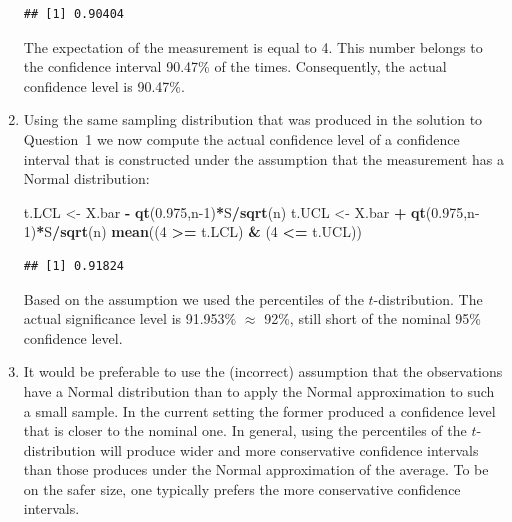 \documentclass[]{krantz}
\makeatletter
\newenvironment{Shaded}{\begin{snugshade}}{\end{snugshade}}
\newcommand{\DecValTok}[1]{\textcolor[rgb]{0.00,0.00,0.81}{#1}}
\newcommand{\FloatTok}[1]{\textcolor[rgb]{0.00,0.00,0.81}{#1}}
\newcommand{\KeywordTok}[1]{\textcolor[rgb]{0.13,0.29,0.53}{\textbf{#1}}}
\newcommand{\NormalTok}[1]{#1}
\newcommand{\OperatorTok}[1]{\textcolor[rgb]{0.81,0.36,0.00}{\textbf{#1}}}
\newcommand{\StringTok}[1]{\textcolor[rgb]{0.31,0.60,0.02}{#1}}
\newenvironment{kframe}{%
\medskip{}
\setlength{\fboxsep}{.8em}
 \def\at@end@of@kframe{}%
 \ifinner\ifhmode%
  \def\at@end@of@kframe{\end{minipage}}%
  \begin{minipage}{\columnwidth}%
 \fi\fi%
 \def\FrameCommand##1{\hskip\@totalleftmargin \hskip-\fboxsep
 \colorbox{shadecolor}{##1}\hskip-\fboxsep
     \hskip-\linewidth \hskip-\@totalleftmargin \hskip\columnwidth}%
 \MakeFramed {\advance\hsize-\width
   \@totalleftmargin\z@ \linewidth\hsize
   \@setminipage}}%
 {\par\unskip\endMakeFramed%
 \at@end@of@kframe}
\renewenvironment{Shaded}{\begin{kframe}}{\end{kframe}}
\theoremstyle{definition}
\theoremstyle{definition}
\theoremstyle{definition}
\theoremstyle{remark}
\makeatother
\begin{document}
\begin{enumerate}
\begin{verbatim}
## [1] 0.90404
\end{verbatim}

  The expectation of the measurement is equal to 4. This number belongs to
  the confidence interval 90.47\% of the times. Consequently, the actual
  confidence level is 90.47\%.
\item
  Using the same sampling
  distribution that was produced in the solution to Question~1 we now
  compute the actual confidence level of a confidence interval that is
  constructed under the assumption that the measurement has a Normal
  distribution:

\begin{Shaded}
\begin{Highlighting}[]
\NormalTok{t.LCL <-}\StringTok{ }\NormalTok{X.bar }\OperatorTok{-}\StringTok{ }\KeywordTok{qt}\NormalTok{(}\FloatTok{0.975}\NormalTok{,n}\DecValTok{-1}\NormalTok{)}\OperatorTok{*}\NormalTok{S}\OperatorTok{/}\KeywordTok{sqrt}\NormalTok{(n)}
\NormalTok{t.UCL <-}\StringTok{ }\NormalTok{X.bar }\OperatorTok{+}\StringTok{ }\KeywordTok{qt}\NormalTok{(}\FloatTok{0.975}\NormalTok{,n}\DecValTok{-1}\NormalTok{)}\OperatorTok{*}\NormalTok{S}\OperatorTok{/}\KeywordTok{sqrt}\NormalTok{(n)}
\KeywordTok{mean}\NormalTok{((}\DecValTok{4} \OperatorTok{>=}\StringTok{ }\NormalTok{t.LCL) }\OperatorTok{&}\StringTok{ }\NormalTok{(}\DecValTok{4} \OperatorTok{<=}\StringTok{ }\NormalTok{t.UCL))}
\end{Highlighting}
\end{Shaded}

\begin{verbatim}
## [1] 0.91824
\end{verbatim}

  Based on the assumption we used the percentiles of the \(t\)-distribution.
  The actual significance level is 91.953\% \(\approx\) 92\%, still short of
  the nominal 95\% confidence level.
\item
  It would be preferable to use the
  (incorrect) assumption that the observations have a Normal distribution
  than to apply the Normal approximation to such a small sample. In the
  current setting the former produced a confidence level that is closer to
  the nominal one. In general, using the percentiles of the
  \(t\)-distribution will produce wider and more conservative confidence
  intervals than those produces under the Normal approximation of the
  average. To be on the safer size, one typically prefers the more
  conservative confidence intervals.
\end{enumerate}
\end{document}
